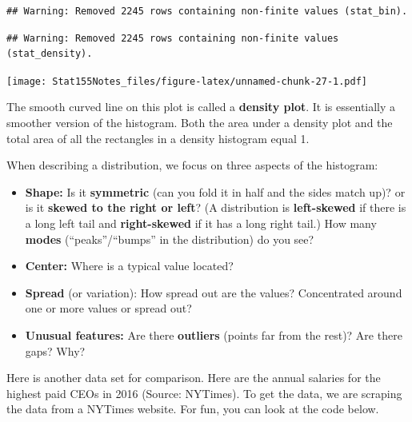 \documentclass[]{book}
\providecommand{\tightlist}{%
  \setlength{\itemsep}{0pt}\setlength{\parskip}{0pt}}
\begin{document}
\begin{verbatim}
## Warning: Removed 2245 rows containing non-finite values (stat_bin).
\end{verbatim}

\begin{verbatim}
## Warning: Removed 2245 rows containing non-finite values (stat_density).
\end{verbatim}

\texttt{[image: Stat155Notes\_files/figure-latex/unnamed-chunk-27-1.pdf]}

The smooth curved line on this plot is called a \textbf{density plot}. It is essentially a smoother version of the histogram. Both the area under a density plot and the total area of all the rectangles in a density histogram equal 1.

When describing a distribution, we focus on three aspects of the histogram:

\begin{itemize}
\tightlist
\item
  \textbf{Shape:} Is it \textbf{symmetric} (can you fold it in half and the sides match up)? or is it \textbf{skewed to the right or left}? (A distribution is \textbf{left-skewed} if there is a long left tail and \textbf{right-skewed} if it has a long right tail.) How many \textbf{modes} (``peaks''/``bumps'' in the distribution) do you see?
\item
  \textbf{Center:} Where is a typical value located?
\item
  \textbf{Spread} (or variation): How spread out are the values? Concentrated around one or more values or spread out?
\item
  \textbf{Unusual features:} Are there \textbf{outliers} (points far from the rest)? Are there gaps? Why?
\end{itemize}

Here is another data set for comparison. Here are the annual salaries for the highest paid CEOs in 2016 (Source: NYTimes). To get the data, we are scraping the data from a NYTimes website. For fun, you can look at the code below.
\end{document}
